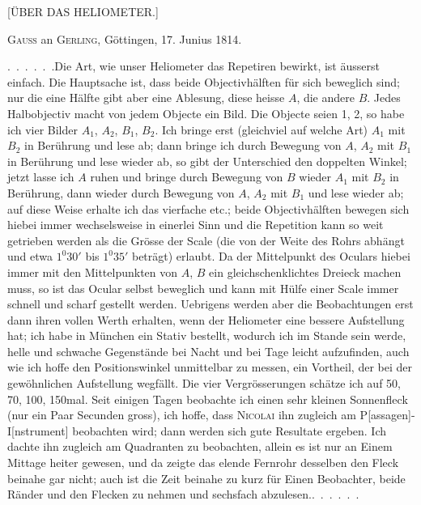 \clearpage\begingroup
\newfontfamily{}

\NoSourceHead
\begin{center}{\Large [ÜBER DAS HELIOMETER.]}\par\bigskip
{\large{}}\par\medskip
\textsc{Gauss} an \textsc{Gerling}, Göttingen, 17. Junius 1814.\end{center}
\noindent\hspace*{\parindent}\mbox{. . . . . .}\quad Die Art, wie unser Heliometer das Repetiren bewirkt, ist äusserst einfach. Die Hauptsache ist, dass beide Objectivhälften für sich beweglich sind; nur die eine Hälfte gibt aber eine Ablesung, diese heisse $A$, die andere $B$. Jedes Halbobjectiv macht von jedem Objecte ein Bild. Die Objecte seien 1, 2, so habe ich vier Bilder $A_1$, $A_2$, $B_1$, $B_2$. Ich bringe erst (gleichviel auf welche Art) $A_1$ mit $B_2$ in Berührung und lese ab; dann bringe ich durch Bewegung von $A$, $A_2$ mit $B_1$ in Berührung und lese wieder ab, so gibt der Unterschied den doppelten Winkel; jetzt lasse ich $A$ ruhen und bringe durch Bewegung von $B$ wieder $A_1$ mit $B_2$ in Berührung, dann wieder durch Bewegung von $A$, $A_2$ mit $B_1$ und lese wieder ab; auf diese Weise erhalte ich das vierfache etc.; beide Objectivhälften bewegen sich hiebei immer wechselsweise in einerlei Sinn und die Repetition kann so weit getrieben werden als die Grösse der Scale (die von der Weite des Rohrs abhängt und etwa $1^0 30'$ bis $1^0 35'$ beträgt) erlaubt. Da der Mittelpunkt des Oculars hiebei immer mit den Mittelpunkten von $A$, $B$ ein gleichschenklichtes Dreieck machen muss, so ist das Ocular selbst beweglich und kann mit Hülfe einer Scale immer schnell und scharf gestellt werden. Uebrigens werden aber die Beobachtungen erst dann ihren vollen Werth erhalten, wenn der Heliometer eine bessere Aufstellung hat; ich habe in München ein  Stativ bestellt, wodurch ich im Stande sein werde, helle und schwache Gegenstände bei Nacht und bei Tage leicht aufzufinden, auch wie ich hoffe
\clearpage{}
\noindent den Positionswinkel unmittelbar zu messen, ein Vortheil, der bei der gewöhnlichen Aufstellung wegfällt. Die vier Vergrösserungen schätze ich auf 50, 70, 100, 150mal. Seit einigen Tagen beobachte ich einen sehr kleinen Sonnenfleck (nur ein Paar Secunden gross), ich hoffe, dass \textsc{Nicolai} ihn zugleich am P[assagen]-I[nstrument] beobachten wird; dann werden sich gute Resultate ergeben. Ich dachte ihn zugleich am Quadranten zu beobachten, allein es ist nur an Einem Mittage heiter gewesen, und da zeigte das elende Fernrohr desselben den Fleck beinahe gar nicht; auch ist die Zeit beinahe zu kurz für Einen Beobachter, beide Ränder und den Flecken zu nehmen und sechsfach abzulesen.\quad\mbox{. . . . . .}
